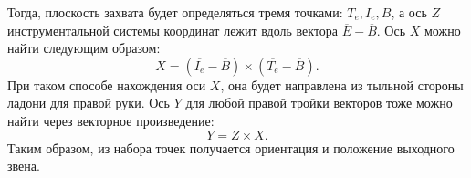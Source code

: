 \documentclass[12pt, a4paper]{article}
\begin{document}
Тогда, плоскость захвата будет определяться тремя точками: $T_e, I_e, B$, а ось
$Z$ инструментальной системы координат лежит вдоль вектора $\overline{E} -
\overline{B}$. Ось $X$ можно найти следующим образом:
\begin{equation}
  X = (\overline{I_e} - \overline{B}) \times (\overline{T_e} - \overline{B}).
  \label{eqn:instumental_x_axis}
\end{equation}
При таком способе нахождения оси $X$, она будет направлена из тыльной стороны
ладони для правой руки.
Ось $Y$ для любой правой тройки векторов тоже можно найти через векторное произведение:
\begin{equation}
  Y = Z \times X.
  \label{eqn:instumental_y_axis}
\end{equation}
Таким образом, из набора точек получается ориентация и положение выходного
звена.
\end{document}
